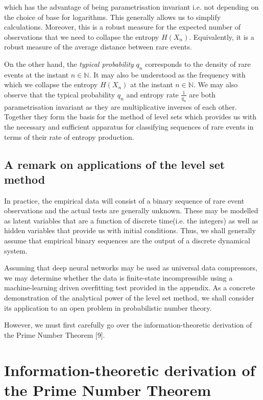 \documentclass{article}
\begin{document}
which has the advantage of being 
parametrisation invariant i.e. not depending on the choice of base for logarithms. This generally allows us to simplify calculations. Moreover, this is a robust measure for the expected number of observations that we need to collapse the entropy $H(X_n)$. Equivalently, it is a robust measure of the average distance between rare events. 

On the other hand, the \textit{typical probability} $q_n$ corresponds to the 
density of rare events at the instant $n \in \mathbb{N}$. It may also be understood as the frequency with which we collapse the entropy $H(X_n)$ at the instant $n \in \mathbb{N}$. We may also observe that the typical probability $q_n$ and entropy rate $\frac{1}{q_n}$ are both parametrisation invariant as they are multiplicative inverses of each other.
Together they form the basis for the method of level sets which provides us with 
the necessary and sufficient apparatus for classifying sequences of rare events 
in terms of their rate of entropy production.  

\subsection{A remark on applications of the level set method}

In practice, the empirical data will consist of a binary sequence of rare event 
observations and the actual tests are generally unknown. These may be modelled 
as latent variables that are a function of discrete time(i.e. the integers) as 
well as hidden variables that provide us with initial conditions. Thus, we shall 
generally assume that empirical binary sequences are the output of a discrete dynamical system.

Assuming that deep neural networks may be used as universal data compressors, we may determine whether the data is finite-state incompressible using a machine-learning driven overfitting test provided in the appendix. As a concrete demonstration of the analytical power of the level set method, we shall consider its application to an open problem in probabilistic number theory. 

However, we must first carefully go over the information-theoretic derivation of the Prime Number Theorem [9]. 

\newpage 

\section{Information-theoretic derivation of the Prime Number Theorem}
\end{document}

